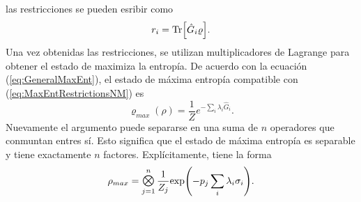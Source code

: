 las restricciones se pueden esribir como
\begin{equation}\label{eq:MaxEntRestrictionsNM}
    r_{i}=\Tr[\hat{G}_{i}\varrho].
\end{equation}
Una vez obtenidas las restricciones, se utilizan multiplicadores de Lagrange para obtener el estado de maximiza la entropía. De acuerdo con la ecuación (\ref{eq:GeneralMaxEnt}), el estado de máxima entropía compatible con (\ref{eq:MaxEntRestrictionsNM}) es
\begin{equation}\label{eq:MaxEntLagMult}
    \varrho_{max}(\rho)=\frac{1}{Z}e^{-\sum_{i}\lambda_{i}\hat{G}_{i}}.
\end{equation}
Nuevamente el argumento puede separarse en una suma de $n$ operadores que conmuntan entres sí. Esto significa que el estado de máxima entropía es separable y tiene exactamente $n$ factores. Explícitamente, tiene la forma
\begin{equation}
    \rho_{max}=\Motimes_{j=1}^{n}\frac{1}{Z_{j}}\text{exp}\qty(-p_{j}\sum_{i}\lambda_{i}\sigma_{i}).
\end{equation}